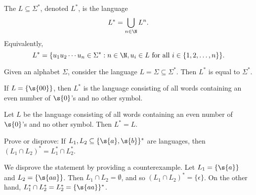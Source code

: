 \begin{flex}
\begin{definition} \label{definition:Star-operation-on-a-language}
The  $L \subseteq \Sigma^*$, denoted $L^*$, is the language 
\[
L^* = \bigcup_{n \in \N} L^n.
\]
Equivalently, 
\[
L^* = \{u_1u_2\cdots u_n \in \Sigma^* : n \in \N, u_i \in L \text{ for all } i \in \{1,2,\ldots,n\}\}.
\]
\end{definition}

\begin{example}[$\Sigma^*$] \label{example:Sigma-star}
Given an alphabet $\Sigma$, consider the language $L = \Sigma \subseteq \Sigma^*$. Then $L^*$ is equal to $\Sigma^*$.
\end{example}

\begin{example}[$\{00\}^*$] \label{example:00-star}
If $L = \{\s{00}\}$, then $L^*$ is the language consisting of all words containing an even number of $\s{0}$'s and no other symbol. 
\end{example}

\begin{example}[$(\{00\}^*)^*$] \label{example:00-starstar}
Let $L$ be the language consisting of all words containing an even number of $\s{0}$'s and no other symbol. Then $L^* = L$. 
\end{example}
\end{flex}


\begin{flex}
\begin{exercise} \label{exercise:Can-you-distribute-star-over-intersection}
Prove or disprove: If $L_1, L_2 \subseteq \{\s{a},\s{b}\}^*$ are languages, then $(L_1 \cap L_2)^* = L_1^* \cap L_2^*$.
\end{exercise}

\begin{solution}
We disprove the statement by providing a counterexample. Let $L_1 = \{\s{a}\}$ and $L_2 = \{\s{aa}\}$. Then $L_1 \cap L_2 = \emptyset$, and so $(L_1 \cap L_2)^* = \{\epsilon\}$. On the other hand, $L_1^* \cap L_2^* = L_2^* = \{\s{aa}\}^*$.
\end{solution}
\end{flex}


